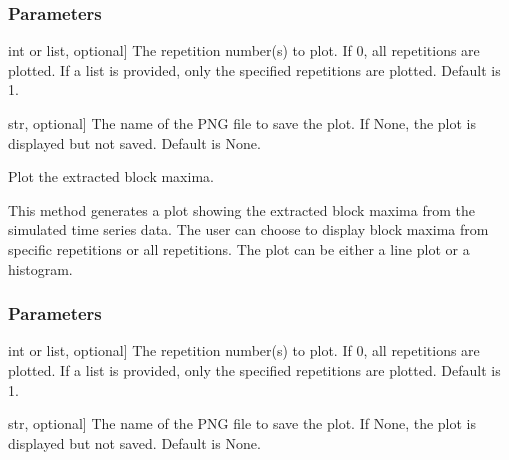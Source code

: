 \documentclass[a4paper,11pt,openany,english]{sphinxmanual}
\begin{document}
\begin{fulllineitems}
\begin{fulllineitems}
\subsubsection{Parameters}
\label{\detokenize{api_topt:id3}}\begin{description}
\sphinxlineitem{rep}{[}int or list, optional{]}
\sphinxAtStartPar
The repetition number(s) to plot. If 0, all repetitions are plotted. If a list is provided, 
only the specified repetitions are plotted. Default is 1.

\sphinxlineitem{filename}{[}str, optional{]}
\sphinxAtStartPar
The name of the PNG file to save the plot. If None, the plot is displayed but not saved. Default is None.

\end{description}

\end{fulllineitems}


\begin{fulllineitems}
\label{\detokenize{api_topt:xtremes.topt.TimeSeries.plot_blockmaxima}}
\pysigstartsignatures
{}
\pysigstopsignatures
\sphinxAtStartPar
Plot the extracted block maxima.

\sphinxAtStartPar
This method generates a plot showing the extracted block maxima from the simulated time series data. 
The user can choose to display block maxima from specific repetitions or all repetitions. The plot 
can be either a line plot or a histogram.


\subsubsection{Parameters}
\label{\detokenize{api_topt:id4}}\begin{description}
\sphinxlineitem{rep}{[}int or list, optional{]}
\sphinxAtStartPar
The repetition number(s) to plot. If 0, all repetitions are plotted. If a list is provided, 
only the specified repetitions are plotted. Default is 1.

\sphinxlineitem{filename}{[}str, optional{]}
\sphinxAtStartPar
The name of the PNG file to save the plot. If None, the plot is displayed but not saved. Default is None.


\end{description}
\end{fulllineitems}
\end{fulllineitems}
\end{document}
